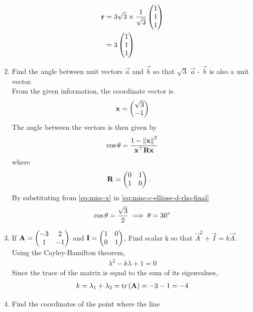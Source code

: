 \documentclass[journal,12pt,twocolumn]{IEEEtran}
\renewcommand\thesection{\arabic{section}}
\begin{document}
\begin{enumerate}[label=\thesection.\arabic*.,ref=\thesection.\theenumi]
  \begin{align}
	  \mathbf{r} &=  3\sqrt{3}\times \frac{1}{\sqrt{3}}\begin{pmatrix}1\\1\\1\end{pmatrix}
	  \\
		  &=3\begin{pmatrix}1\\1\\1\end{pmatrix}
	  \label{eq:equal_incline_unit_ans}
  \end{align}
\item Find the angle between unit vectors $\overrightarrow{a}$ and $\overrightarrow{b}$ so that $\sqrt{3}$ $\overrightarrow{a}$ - $\overrightarrow{b}$ is also a unit vector.\\
	\solution 
	From the given information, the coordinate vector  is 
  \begin{align}
	  \mathbf{x} = \begin{pmatrix}\sqrt{3} \\ -1\end{pmatrix}
			\label{eq:misc-x}
  \end{align}
  The angle between the vectors is then given by 
		\begin{align}
	\cos \theta
			= \frac{1 - \left\lVert\mathbf{x}\right\rVert^2}{\mathbf{x}^{\top}\mathbf{R}\mathbf{x}}
			\label{eq:misc-c-ellipse-d-rho-final}
		\end{align}
		where 
		\begin{align}
			\mathbf{R}	&= \begin{pmatrix}0 & 1 \\ 1 & 0\end{pmatrix}.
		\end{align}
		By substituting from 
			\eqref{eq:misc-x}
			in 
			\eqref{eq:misc-c-ellipse-d-rho-final}
  \begin{align}
\cos \theta=   \frac{\sqrt{3}}{2} \implies \theta = 30 \degree
  \end{align}
\item If $\mathbf{A}=\begin{pmatrix}-3 & 2 \\ 1 & -1\end{pmatrix} $ and $ \mathbf{I}=\begin{pmatrix}1 & 0 \\ 0 & 1\end{pmatrix}$, Find scalar k so that $\vec{A}^2 + \vec{I} = k\vec{A}$.\\
	\solution Using the Cayley-Hamilton theorem, 
  \begin{align}
	  \lambda^2 - k \lambda + 1 = 0
	  \label{eq:cayley_applic}
  \end{align}
  Since the trace of the matrix is equal to the sum of its eigenvalues, 
  \begin{align}
	   k  = \lambda_1+\lambda_2 = \text{tr}\left(\mathbf{A}\right) = -3-1 = -4
	  \label{eq:cayley_sol}
  \end{align}
\item  Find the coordinates of the point where the line 

\end{enumerate}
\end{document}
